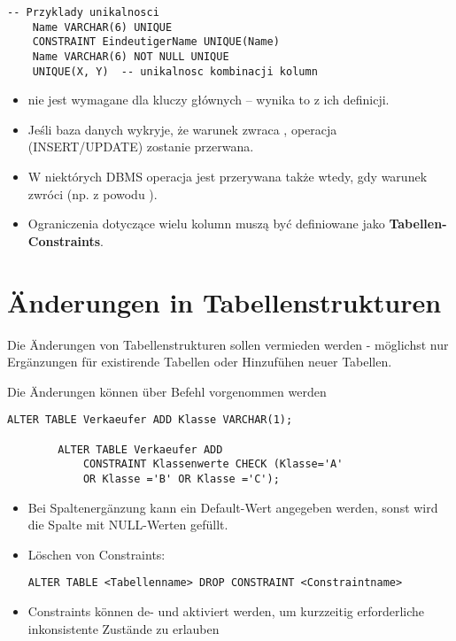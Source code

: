     \begin{lstlisting}[style=sqlstyle]
    -- Przyklady unikalnosci
    Name VARCHAR(6) UNIQUE
    CONSTRAINT EindeutigerName UNIQUE(Name)
    Name VARCHAR(6) NOT NULL UNIQUE
    UNIQUE(X, Y)  -- unikalnosc kombinacji kolumn
    \end{lstlisting}

    \begin{itemize}
        \item {} nie jest wymagane dla kluczy głównych – wynika to z ich definicji.
        \item Jeśli baza danych wykryje, że warunek  zwraca , operacja (INSERT/UPDATE) zostanie przerwana.
        \item W niektórych DBMS operacja jest przerywana także wtedy, gdy warunek zwróci  (np. z powodu ).
        \item Ograniczenia dotyczące wielu kolumn muszą być definiowane jako \textbf{Tabellen-Constraints}.
    \end{itemize}

\section{Änderungen in Tabellenstrukturen}
    \begin{tcolorbox}[red, title={Hinweis}]
        Die Änderungen von Tabellenstrukturen sollen vermieden werden - möglichst nur Ergänzungen für existirende Tabellen oder Hinzufühen neuer Tabellen.
    \end{tcolorbox}

    Die Änderungen können über Befehl  vorgenommen werden

    \begin{lstlisting}[style=sqlstyle]
        ALTER TABLE Verkaeufer ADD Klasse VARCHAR(1);

        ALTER TABLE Verkaeufer ADD
            CONSTRAINT Klassenwerte CHECK (Klasse='A'
            OR Klasse ='B' OR Klasse ='C');
    \end{lstlisting}

    \begin{itemize}
        \item Bei Spaltenergänzung kann ein Default-Wert angegeben werden, sonst wird die Spalte mit NULL-Werten gefüllt.
        \item Löschen von Constraints:  
        \begin{lstlisting}[style=sqlstyle]
            ALTER TABLE <Tabellenname> DROP CONSTRAINT <Constraintname>
        \end{lstlisting}
        \item Constraints können de- und aktiviert werden, um kurzzeitig erforderliche inkonsistente Zustände zu erlauben
    \end{itemize}

